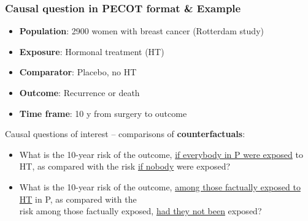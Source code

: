 \documentclass[12pt,dvipsnames,t,aspectratio=169, handout%
]{beamer}
\begin{document}
\begin{frame}
\frametitle{Causal question in PECOT format \& Example}

\begin{itemize}
\item[P] \textbf{Population}: 2900 women with breast cancer (Rotterdam study) 
\item[E] \textbf{Exposure}: Hormonal treatment (HT)
\item[C] \textbf{Comparator}: Placebo, no HT
\item[O] \textbf{Outcome}: Recurrence or death
\item[T] \textbf{Time frame}: 10 y from surgery to outcome
\end{itemize}

\pause

Causal questions of interest -- comparisons of \textbf{counterfactuals}:

\begin{itemize}
\item[--] What is the 10-year risk %
of the outcome,
\underline{if everybody in P were exposed} to HT, as compared with %
the risk
\underline{if nobody} were exposed?
\pause
\medskip
\item[--] What is the 10-year risk %
of the outcome,
\underline{among those factually exposed to HT} in P,  
as compared with the \\ risk  %
among those factually exposed, \underline{had they not been} exposed?
\end{itemize}


\end{frame}
\end{document}
